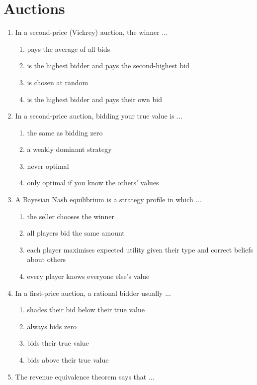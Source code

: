 \documentclass[11pt]{article}
\begin{document}
\section*{Auctions}
\begin{enumerate}[itemsep=6pt]
  \item In a second-price (Vickrey) auction, the winner ...
  \begin{enumerate}
    \item pays the average of all bids
    \item is the highest bidder and pays the second-highest bid
    \item is chosen at random
    \item is the highest bidder and pays their own bid
  \end{enumerate}
  \item In a second-price auction, bidding your true value is ...
  \begin{enumerate}
    \item the same as bidding zero
    \item a weakly dominant strategy
    \item never optimal
    \item only optimal if you know the others' values
  \end{enumerate}
  \item A Bayesian Nash equilibrium is a strategy profile in which ...
  \begin{enumerate}
    \item the seller chooses the winner
    \item all players bid the same amount
    \item each player maximises expected utility given their type and correct beliefs about others
    \item every player knows everyone else's value
  \end{enumerate}
  \item In a first-price auction, a rational bidder usually ...
  \begin{enumerate}
    \item shades their bid below their true value
    \item always bids zero
    \item bids their true value
    \item bids above their true value
  \end{enumerate}
  \item The revenue equivalence theorem says that ...
  \begin{enumerate}

\end{enumerate}
\end{enumerate}
\end{document}
